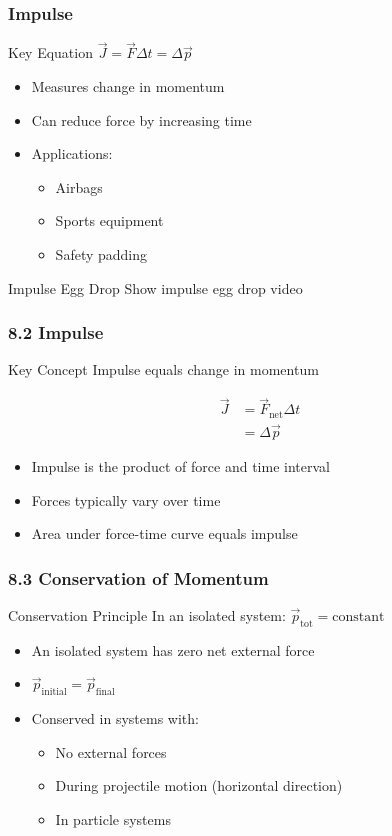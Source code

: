 \documentclass[aspectratio=169]{beamer}
\begin{document}
\begin{frame}
\frametitle{Impulse}
\begin{block}{Key Equation}
$\vec{J} = \vec{F}\Delta t = \Delta \vec{p}$
\end{block}
\begin{itemize}
\item Measures change in momentum
\item Can reduce force by increasing time
\item Applications:
    \begin{itemize}
    \item Airbags
    \item Sports equipment
    \item Safety padding
    \end{itemize}
\end{itemize}
\end{frame}
\begin{frame}{Impulse Egg Drop}
    Show impulse egg drop video
\end{frame}
\begin{frame}
\frametitle{8.2 Impulse}
\begin{block}{Key Concept}
Impulse equals change in momentum
\end{block}

\begin{align*}
\vec{J} &= \vec{F}_{\text{net}}\Delta t \\
&= \Delta \vec{p}
\end{align*}

\begin{itemize}
\item Impulse is the product of force and time interval
\item Forces typically vary over time
\item Area under force-time curve equals impulse
\end{itemize}
\end{frame}

\begin{frame}
\frametitle{8.3 Conservation of Momentum}
\begin{block}{Conservation Principle}
In an isolated system: $\vec{p}_{\text{tot}} = \text{constant}$
\end{block}

\begin{itemize}
\item An isolated system has zero net external force
\item $\vec{p}_{\text{initial}} = \vec{p}_{\text{final}}$
\item Conserved in systems with:
    \begin{itemize}
    \item No external forces
    \item During projectile motion (horizontal direction)
    \item In particle systems
    \end{itemize}
\end{itemize}
\end{frame}
\end{document}
